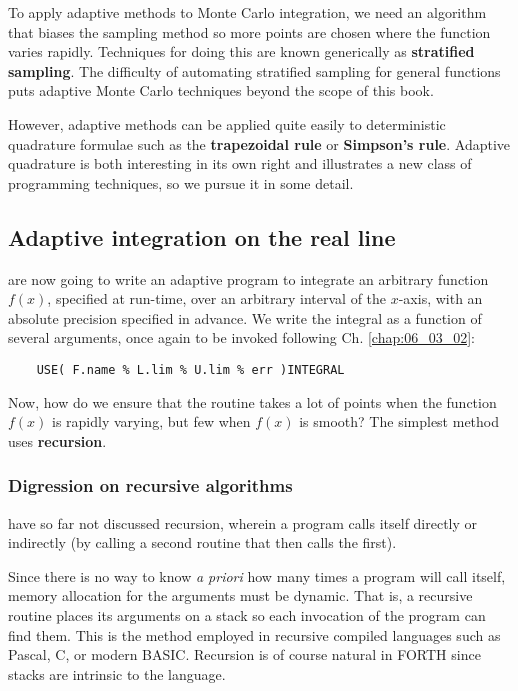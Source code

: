 To apply adaptive methods to Monte Carlo integration, we need an algorithm that biases the sampling method so more points are chosen where the function varies rapidly. Techniques for doing this are known generically as \textbf{stratified sampling}. The difficulty of automating stratified sampling for general functions puts adaptive Monte Carlo techniques beyond the scope of this book.

However, adaptive methods can be applied quite easily to deterministic quadrature formulae such as the \textbf{trapezoidal rule} or \textbf{Simpson’s rule}. Adaptive quadrature is both interesting in its own right and illustrates a new class of programming techniques, so we pursue it in some detail.

\subsection{Adaptive integration on the real line}
 are now going to write an adaptive program to integrate an arbitrary function $f(x)$, specified at run-time, over an arbitrary interval of the $x$-axis, with an absolute precision specified in advance. We write the integral as a function of several arguments, once again to be invoked following Ch. \ref{chap:06_03_02}:

\begin{lstlisting}
    USE( F.name % L.lim % U.lim % err )INTEGRAL
\end{lstlisting}

Now, how do we ensure that the routine takes a lot of points when the function $f(x)$ is rapidly varying, but few when $f(x)$ is smooth? The simplest method uses \textbf{recursion}.

\subsubsection{Digression on recursive algorithms}
 have so far not discussed recursion, wherein a program calls itself directly or indirectly (by calling a second routine that then calls the first).

Since there is no way to know \textit{a priori} how many times a program will call itself, memory allocation for the arguments must be dynamic. That is, a recursive routine places its arguments on a stack so each invocation of the program can find them. This is the method employed in recursive compiled languages such as Pascal, C, or modern BASIC. Recursion is of course natural in FORTH since stacks are intrinsic to the language.

